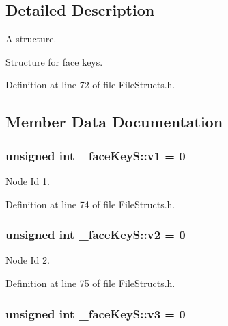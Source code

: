 \subsection{Detailed Description}
A structure. 

Structure for face keys. 

Definition at line 72 of file File\+Structs.\+h.



\subsection{Member Data Documentation}
\subsubsection[{\texorpdfstring{v1}{v1}}]{\setlength{\rightskip}{0pt plus 5cm}unsigned int \+\_\+face\+Key\+S\+::v1 = 0}\hypertarget{struct__face_key_s_a7dc4ab7129a845a6569c608883f54b9e}{}\label{struct__face_key_s_a7dc4ab7129a845a6569c608883f54b9e}


Node Id 1. 



Definition at line 74 of file File\+Structs.\+h.

\subsubsection[{\texorpdfstring{v2}{v2}}]{\setlength{\rightskip}{0pt plus 5cm}unsigned int \+\_\+face\+Key\+S\+::v2 = 0}\hypertarget{struct__face_key_s_ab569c6f63422ef80ecc9f68f76ed4772}{}\label{struct__face_key_s_ab569c6f63422ef80ecc9f68f76ed4772}


Node Id 2. 



Definition at line 75 of file File\+Structs.\+h.

\subsubsection[{\texorpdfstring{v3}{v3}}]{\setlength{\rightskip}{0pt plus 5cm}unsigned int \+\_\+face\+Key\+S\+::v3 = 0}\hypertarget{struct__face_key_s_a9ffa3194f755b6e336c387db285821a6}{}\label{struct__face_key_s_a9ffa3194f755b6e336c387db285821a6}


